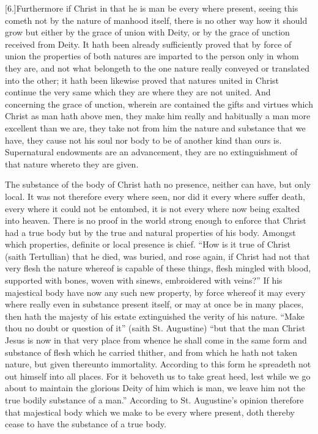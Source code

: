[6.]Furthermore if Christ in that he is man be every where present, seeing this cometh not by the nature of manhood itself, there is no other way how it should grow but either by the grace of union with Deity, or by the grace of unction received from Deity. It hath been already sufficiently proved that by force of union the properties of both natures are imparted to the person only in whom they are, and not what belongeth to the one nature really conveyed or translated into the other; it hath been likewise proved that natures united in Christ continue the very same which they are where they are not united. And concerning the grace of unction, wherein are contained the gifts and virtues which Christ as man hath above men, they make him really and habitually a man more excellent than we are, they take not from him the nature and substance that we have, they cause not his soul nor body to be of another kind than ours is. Supernatural endowments are an advancement, they are no extinguishment of that nature whereto they are given.

The substance of the body of Christ hath no presence, neither can have, but only local. It was not therefore every where seen, nor did it every where suffer death, every where it could not be entombed, it is not every where now being exalted into heaven. There is no proof in the world strong enough to enforce that Christ had a true body but by the true and natural properties of his body. Amongst which properties, definite or local presence is chief. “How is it true of Christ (saith Tertullian) that he died, was buried, and rose again, if Christ had not that very flesh the nature whereof is capable of these things, flesh mingled with blood, supported with bones, woven with sinews, embroidered with  veins?”
 If his majestical body have now any such new property, by force whereof it may every where really even in substance present itself, or may at once be in many places, then hath the majesty of his estate extinguished the verity of his nature. “Make thou no doubt or question of it” (saith St. Augustine) “but that the man Christ Jesus is now in that very place from whence he shall come in the same form and substance of flesh which he carried thither, and from which he hath not taken nature, but given thereunto immortality. According to this form he spreadeth not out himself into all places. For it behoveth us to take great heed, lest while we go about to maintain the glorious Deity of him which is man, we leave him not the true bodily substance of a man.” According to St. Augustine’s opinion therefore that majestical body which we make to be every where present, doth thereby cease to have the substance of a true body.

